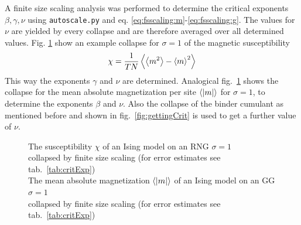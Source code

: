     A finite size scaling analysis was
    performed to determine the critical exponents \(\beta, \gamma, \nu\)
    using \texttt{autoscale.py} \cite{autoscale2009} and eq. \eqref{eq:fsscaling:m}-\eqref{eq:fsscaling:g}.
    The values for \(\nu\) are yielded by every collapse and are therefore
    averaged over all determined values. Fig. \ref{fig:gettingCrit2}
    show an example collapse for \(\sigma=1\) of the magnetic susceptibility
    \begin{equation}
        \chi = \frac{1}{TN}\left< \left< m^2 \right> - \left< m \right>^2 \right>
    \end{equation}
    This way the exponents \(\gamma\) and \(\nu\) are determined.
    Analogical fig.\ \ref{fig:gettingCrit2}
    shows the collapse for the mean absolute magnetization per site \(\left< \left\vert m\right\vert \right>\) for \(\sigma=1\),
    to determine the exponents \(\beta\) and \(\nu\).
    Also the collapse of the binder cumulant as mentioned before and shown
    in fig.\ \ref{fig:gettingCrit}
    is used to get a further value of \(\nu\).
    \begin{figure}[htbp]
        \centering
        \caption[Examples of Determining Critical Temperature and Exponents]
        {
             The susceptibility \(\chi\)
                of an Ising model on an RNG \(\sigma=1\)\\
             collapsed by finite
                size scaling (for error estimates see tab.\ \ref{tab:critExp})\\
             The mean absolute magnetization \(\left< \left\vert m\right\vert \right>\)
                of an Ising model on an GG \(\sigma=1\)\\
             collapsed by finite
                size scaling (for error estimates see tab.\ \ref{tab:critExp})
        }
        \label{fig:gettingCrit2}
    \end{figure}\\
